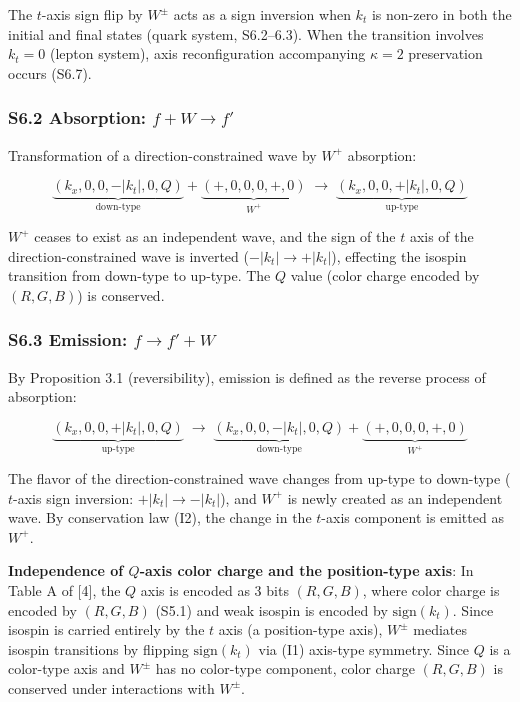 \documentclass[
  a4paper,11pt]{article}
\theoremstyle{definition}
\theoremstyle{remark}
\begin{document}
The \(t\)-axis sign flip by \(W^{\pm}\) acts as a sign inversion when
\(k_t\) is non-zero in both the initial and final states (quark system,
S6.2--6.3). When the transition involves \(k_t = 0\) (lepton system),
axis reconfiguration accompanying \(\kappa = 2\) preservation occurs
(S6.7).

\subsubsection{\texorpdfstring{S6.2 Absorption:
\(f + W \to f'\)}{S6.2 Absorption: f + W \textbackslash to f\textquotesingle{}}}\label{s6.2-absorption-f-w-to-f}

Transformation of a direction-constrained wave by \(W^+\) absorption:

\[\underbrace{(k_x, 0, 0, -|k_t|, 0, Q)}_{\text{down-type}} + \underbrace{(+, 0, 0, 0, +, 0)}_{W^+} \;\longrightarrow\; \underbrace{(k_x, 0, 0, +|k_t|, 0, Q)}_{\text{up-type}}\]

\(W^+\) ceases to exist as an independent wave, and the sign of the
\(t\) axis of the direction-constrained wave is inverted
(\(-|k_t| \to +|k_t|\)), effecting the isospin transition from down-type
to up-type. The \(Q\) value (color charge encoded by \((R, G, B)\)) is
conserved.

\subsubsection{\texorpdfstring{S6.3 Emission:
\(f \to f' + W\)}{S6.3 Emission: f \textbackslash to f\textquotesingle{} + W}}\label{s6.3-emission-f-to-f-w}

By Proposition 3.1 (reversibility), emission is defined as the reverse
process of absorption:

\[\underbrace{(k_x, 0, 0, +|k_t|, 0, Q)}_{\text{up-type}} \;\longrightarrow\; \underbrace{(k_x, 0, 0, -|k_t|, 0, Q)}_{\text{down-type}} + \underbrace{(+, 0, 0, 0, +, 0)}_{W^+}\]

The flavor of the direction-constrained wave changes from up-type to
down-type (\(t\)-axis sign inversion: \(+|k_t| \to -|k_t|\)), and
\(W^+\) is newly created as an independent wave. By conservation law
(I2), the change in the \(t\)-axis component is emitted as \(W^+\).

\textbf{Independence of \(Q\)-axis color charge and the position-type
axis}: In Table A of {[}4{]}, the \(Q\) axis is encoded as 3 bits
\((R, G, B)\), where color charge is encoded by \((R, G, B)\) (S5.1) and
weak isospin is encoded by \(\mathrm{sign}(k_t)\). Since isospin is
carried entirely by the \(t\) axis (a position-type axis), \(W^{\pm}\)
mediates isospin transitions by flipping \(\mathrm{sign}(k_t)\) via (I1)
axis-type symmetry. Since \(Q\) is a color-type axis and \(W^{\pm}\) has
no color-type component, color charge \((R, G, B)\) is conserved under
interactions with \(W^{\pm}\).
\end{document}
